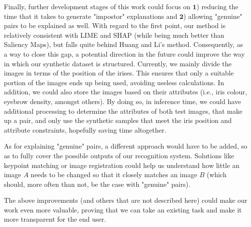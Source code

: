 Finally, further development stages of this work could focus on $\mathbf{1}$) reducing the time that it takes to generate "impostor" explanations and $\mathbf{2}$) allowing "genuine" pairs to be explained as well. With regard to the first point, our method is relatively consistent with \ac{LIME} and \ac{SHAP} (while being much better than Saliency Maps), but falls quite behind Huang and Li's method. Consequently, as a way to close this gap, a potential direction in the future could improve the way in which our synthetic dataset is structured. Currently, we mainly divide the images in terms of the position of the irises. This ensures that only a suitable portion of the images ends up being used, avoiding useless calculations. In addition, we could also store the images based on their attributes (i.e., iris colour, eyebrow density, amongst others). By doing so, in inference time, we could have additional processing to determine the attributes of both test images, that make up a pair, and only use the synthetic samples that meet the iris position and attribute constraints, hopefully saving time altogether.

As for explaining "genuine" pairs, a different approach would have to be added, so as to fully cover the possible outputs of our recognition system. Solutions like keypoint matching or image registration could help us understand how little an image $A$ needs to be changed so that it closely matches an image $B$ (which should, more often than not, be the case with "genuine" pairs).

The above improvements (and others that are not described here) could make our work even more valuable, proving that we can take an existing task and make it more transparent for the end user.
